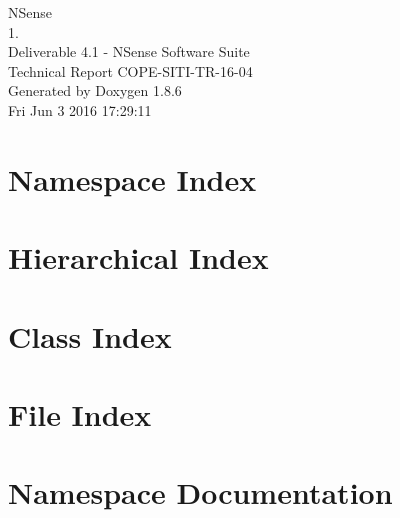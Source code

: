 \documentclass[twoside]{book}
\newcommand{\clearemptydoublepage}{%
  \newpage{\pagestyle{empty}\cleardoublepage}%
}
\begin{document}
\hypersetup{pageanchor=false}
\begin{titlepage}
\vspace*{7cm}
\begin{center}%
{\Large N\-Sense \\[1ex]\large 1. }\\
\vspace*{1cm}
{\large Deliverable 4.1 - NSense Software Suite}\\
\vspace*{0.5cm}
{\large Technical Report COPE-SITI-TR-16-04}\\
\vspace*{0.5cm}
{\large Generated by Doxygen 1.8.6}\\
\vspace*{0.5cm}
{\small Fri Jun 3 2016 17:29:11}\\
\end{center}
\end{titlepage}
\clearemptydoublepage
\tableofcontents
\clearemptydoublepage
{}
\hypersetup{pageanchor=true}

\chapter{Namespace Index}

\chapter{Hierarchical Index}

\chapter{Class Index}

\chapter{File Index}

\chapter{Namespace Documentation}










\end{document}
